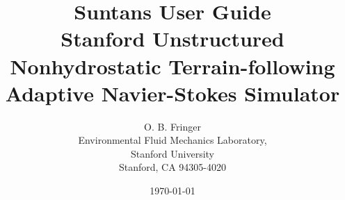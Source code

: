 \documentclass[12pt,oneside]{article}
\newif\ifpdf\ifx\pdfoutput\undefined\pdffalse\else\pdfoutput=1\pdftrue\fi
\newcommand{\pdfgraphics}{\ifpdf\DeclareGraphicsExtensions{.pdf,.jpg}\else\fi}
\begin{document}
\pdfgraphics

\title{Suntans User Guide\\
{\large Stanford Unstructured Nonhydrostatic 
Terrain-following Adaptive Navier-Stokes Simulator}}
\author{O. B. Fringer\\
\small
Environmental Fluid Mechanics Laboratory,  \\
Stanford University\\
Stanford, CA 94305-4020
\normalsize}
\date{\today}

\maketitle

\tableofcontents

\section{Downloading and installing Suntans}

In order to use Suntans, you must also install the message-passing
interface (MPI), the parallel graph partitioning libraries (ParMetis~\cite{PARMETIS[1998]}),
the grid generation package Triangle~\cite{TRIANGLE[1996]}.  Instructions for 
downloading and installing these packages are available from the individual websites
for each package:
\begin{tabbing}
MPI\hspace{0.5in}\=  \verb+http://www-unix.mcs.anl.gov/mpi/mpich/+\\
ParMetis \> \verb+http://www-users.cs.umn.edu/~karypis/metis/parmetis/+\\
Triangle \> \verb+http://www-2.cs.cmu.edu/~quake/triangle.html+
\end{tabbing}
Note that you must compile the triangle libraries as object files by making them
with \verb+make trilibrary+.

\subsection{Downloading and installing the latest source}
\end{document}
